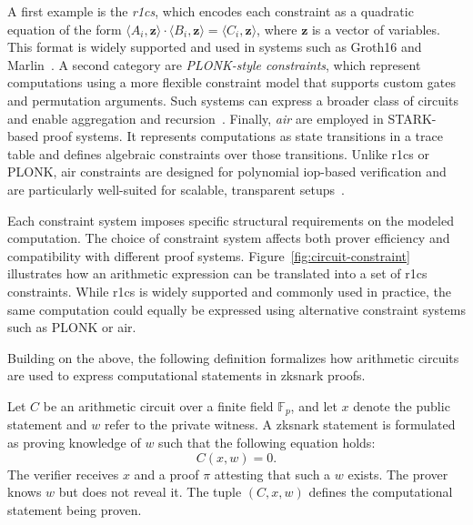 A first example is the \emph{\acrfull{r1cs}}, which encodes each constraint as a quadratic equation of the form $\langle A_i, \mathbf{z} \rangle \cdot \langle B_i, \mathbf{z} \rangle = \langle C_i, \mathbf{z} \rangle$, where $\mathbf{z}$ is a vector of variables. This format is widely supported and used in systems such as Groth16 and Marlin~\cite{groth2016size}. A second category are \emph{PLONK-style constraints}, which represent computations using a more flexible constraint model that supports custom gates and permutation arguments. Such systems can express a broader class of circuits and enable aggregation and recursion~\cite{liang2025}. Finally, \emph{\acrfull{air}} are employed in STARK-based proof systems. It represents computations as state transitions in a trace table and defines algebraic constraints over those transitions. Unlike \acrshort{r1cs} or PLONK, \acrshort{air} constraints are designed for polynomial \acrfull{iop}-based verification and are particularly well-suited for scalable, transparent setups~\cite{cryptoeprint:2018/046, cryptoeprint:2019/1076}.

Each constraint system imposes specific structural requirements on the modeled computation. The choice of constraint system affects both prover efficiency and compatibility with different proof systems. Figure~\ref{fig:circuit-constraint} illustrates how an arithmetic expression can be translated into a set of \acrshort{r1cs} constraints. While \acrshort{r1cs} is widely supported and commonly used in practice, the same computation could equally be expressed using alternative constraint systems such as PLONK or \acrshort{air}.

\CircuitConstraintFigure

Building on the above, the following definition formalizes how arithmetic circuits are used to express computational statements in \acrshort{zksnark} proofs.

\begin{definition}
	Let $C$ be an arithmetic circuit over a finite field $\mathbb{F}_p$, and let $x$ denote the public statement and $w$ refer to the private witness. A \acrshort{zksnark} statement is formulated as proving knowledge of $w$ such that the following equation holds:
	\[
	C(x, w) = 0.
	\]
	The verifier receives $x$ and a proof $\pi$ attesting that such a $w$ exists. The prover knows $w$ but does not reveal it. The tuple $(C, x, w)$ defines the computational statement being proven.
\end{definition}

